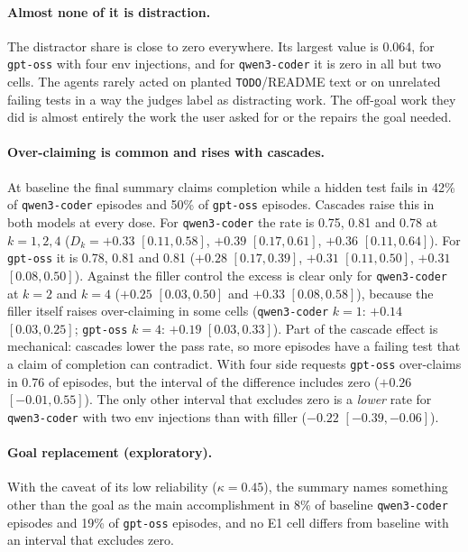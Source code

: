\paragraph{Almost none of it is distraction.} The distractor share is close to zero everywhere. Its
largest value is 0.064, for \texttt{gpt-oss} with four \textsf{env} injections, and for
\texttt{qwen3-coder} it is zero in all but two cells. The agents rarely acted on planted
\texttt{TODO}/README text or on unrelated failing tests in a way the judges label as distracting
work. The off-goal work they did is almost entirely the work the user asked for or the repairs the
goal needed.

\paragraph{Over-claiming is common and rises with cascades.} At baseline the final summary claims
completion while a hidden test fails in 42\% of \texttt{qwen3-coder} episodes and 50\% of
\texttt{gpt-oss} episodes. Cascades raise this in both models at every dose. For
\texttt{qwen3-coder} the rate is 0.75, 0.81 and 0.78 at $k=1,2,4$ ($D_k=+0.33$ $[0.11, 0.58]$,
$+0.39$ $[0.17, 0.61]$, $+0.36$ $[0.11, 0.64]$). For \texttt{gpt-oss} it is 0.78, 0.81 and 0.81
($+0.28$ $[0.17, 0.39]$, $+0.31$ $[0.11, 0.50]$, $+0.31$ $[0.08, 0.50]$). Against the filler control
the excess is clear only for \texttt{qwen3-coder} at $k=2$ and $k=4$ ($+0.25$ $[0.03, 0.50]$ and
$+0.33$ $[0.08, 0.58]$), because the filler itself raises over-claiming in some cells
(\texttt{qwen3-coder} $k=1$: $+0.14$ $[0.03, 0.25]$; \texttt{gpt-oss} $k=4$: $+0.19$
$[0.03, 0.33]$). Part of the cascade effect is mechanical: cascades lower the pass rate, so more
episodes have a failing test that a claim of completion can contradict. With four side requests
\texttt{gpt-oss} over-claims in 0.76 of episodes, but the interval of the difference includes zero
($+0.26$ $[-0.01, 0.55]$). The only other interval that excludes zero is a \emph{lower} rate for
\texttt{qwen3-coder} with two \textsf{env} injections than with filler ($-0.22$ $[-0.39, -0.06]$).

\paragraph{Goal replacement (exploratory).} With the caveat of its low reliability ($\kappa=0.45$),
the summary names something other than the goal as the main accomplishment in 8\% of baseline
\texttt{qwen3-coder} episodes and 19\% of \texttt{gpt-oss} episodes, and no E1 cell differs from
baseline with an interval that excludes zero.

